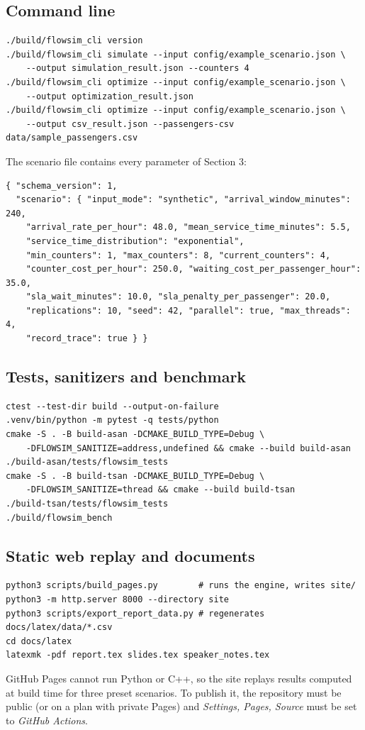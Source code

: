 \documentclass[11pt,a4paper]{article}
\begin{document}
\subsection{Command line}
\begin{lstlisting}
./build/flowsim_cli version
./build/flowsim_cli simulate --input config/example_scenario.json \
    --output simulation_result.json --counters 4
./build/flowsim_cli optimize --input config/example_scenario.json \
    --output optimization_result.json
./build/flowsim_cli optimize --input config/example_scenario.json \
    --output csv_result.json --passengers-csv data/sample_passengers.csv
\end{lstlisting}
The scenario file contains every parameter of Section 3:
\begin{lstlisting}
{ "schema_version": 1,
  "scenario": { "input_mode": "synthetic", "arrival_window_minutes": 240,
    "arrival_rate_per_hour": 48.0, "mean_service_time_minutes": 5.5,
    "service_time_distribution": "exponential",
    "min_counters": 1, "max_counters": 8, "current_counters": 4,
    "counter_cost_per_hour": 250.0, "waiting_cost_per_passenger_hour": 35.0,
    "sla_wait_minutes": 10.0, "sla_penalty_per_passenger": 20.0,
    "replications": 10, "seed": 42, "parallel": true, "max_threads": 4,
    "record_trace": true } }
\end{lstlisting}

\subsection{Tests, sanitizers and benchmark}
\begin{lstlisting}
ctest --test-dir build --output-on-failure
.venv/bin/python -m pytest -q tests/python
cmake -S . -B build-asan -DCMAKE_BUILD_TYPE=Debug \
    -DFLOWSIM_SANITIZE=address,undefined && cmake --build build-asan
./build-asan/tests/flowsim_tests
cmake -S . -B build-tsan -DCMAKE_BUILD_TYPE=Debug \
    -DFLOWSIM_SANITIZE=thread && cmake --build build-tsan
./build-tsan/tests/flowsim_tests
./build/flowsim_bench
\end{lstlisting}

\subsection{Static web replay and documents}
\begin{lstlisting}
python3 scripts/build_pages.py        # runs the engine, writes site/
python3 -m http.server 8000 --directory site
python3 scripts/export_report_data.py # regenerates docs/latex/data/*.csv
cd docs/latex
latexmk -pdf report.tex slides.tex speaker_notes.tex
\end{lstlisting}
GitHub Pages cannot run Python or C++, so the site replays results computed at build time for three preset scenarios.
To publish it, the repository must be public (or on a plan with private Pages) and \emph{Settings, Pages, Source} must
be set to \emph{GitHub Actions}.
\end{document}

